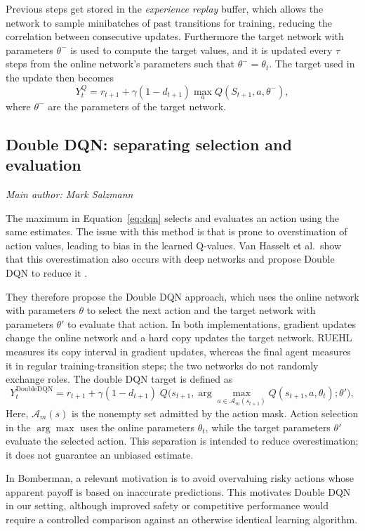 \documentclass[11pt,a4paper]{article}
\newcommand{\contributionauthor}[1]{{\small\textit{Main author: #1}\par}}
\begin{document}
Previous steps get stored in the \emph{experience replay} buffer, which allows the network to sample minibatches of past transitions for training, reducing the correlation between consecutive updates.
Furthermore the target network with parameters $\theta^-$ is used to compute the target values, and it is updated every $\tau$ steps from the online network's parameters such that  $\theta^- = \theta_t$.
The target used in the update then becomes
\begin{equation}
Y^Q_t = r_{t+1} + \gamma(1-d_{t+1}) \max_{a} Q(S_{t+1}, a, \theta^-),
\label{eq:dqn}
\end{equation}
where $\theta^-$ are the parameters of the target network.

\subsection{Double DQN: separating selection and evaluation}
\contributionauthor{Mark Salzmann}
The maximum in Equation~\eqref{eq:dqn} selects and evaluates an action using the same estimates. 
The issue with this method is that is prone to overstimation of action values, leading to bias in the learned Q-values.
Van Hasselt et al.\ show that this overestimation also occurs with deep networks and propose Double DQN to
reduce it \citep{vanhasselt2015double}.

They therefore propose the Double DQN approach, which uses the online network with parameters $\theta$ to select the next action and the target network with parameters $\theta '$ to evaluate that action.
In both implementations, gradient updates change the online network and a hard copy updates the target network. RUEHL measures its copy interval in gradient updates, whereas the final agent measures it in regular training-transition steps; the two networks do not randomly exchange roles.
The double DQN target is defined as
\begin{equation}
Y_t^{\mathrm{DoubleDQN}}=r_{t+1}+\gamma(1-d_{t+1})\;Q\Big(s_{t+1},\arg\max_{a\in\mathcal{A}_m(s_{t+1})}Q(s_{t+1},a, \theta_t);\theta'\Big),
\label{eq:double dqn}
\end{equation}
Here, $\mathcal{A}_m(s)$ is the nonempty set admitted by the action mask. Action selection in the $\arg\max$ uses the online parameters $\theta_t$, while the target parameters $\theta'$ evaluate the selected action. This separation is intended to reduce overestimation; it does not guarantee an unbiased estimate.

In Bomberman, a relevant motivation is to avoid overvaluing risky actions whose apparent payoff is based on inaccurate predictions.
This motivates Double DQN in our setting, although improved safety or competitive performance would require a controlled comparison against an otherwise identical learning algorithm.
\end{document}
